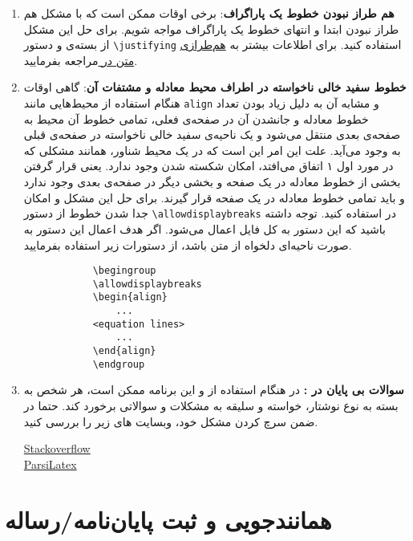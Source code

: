 \begin{enumerate}
\item{\textbf{هم طراز نبودن خطوط یک پاراگراف}:
برخی اوقات ممکن است که با مشکل هم طراز نبودن ابتدا و انتهای خطوط یک پاراگراف مواجه شویم. برای حل این مشکل از بسته‌ی 
 و دستور 
\verb*|\justifying|
استفاده کنید. برای اطلاعات بیشتر به 
\href{https://www.overleaf.com/learn/latex/Text_alignment}{هم‌طرازی متن در \lr{\LaTeX}}
مراجعه بفرمایید. 
}

\item{\textbf{خطوط سفید خالی ناخواسته در اطراف محیط معادله و مشتفات آن}:
گاهی اوقات هنگام استفاده از محیط‌هایی مانند 
\verb*|align|
و مشابه آن به دلیل زیاد بودن تعداد خطوط معادله و جانشدن آن در صفحه‌ی فعلی، تمامی خطوط آن محیط به صفحه‌ی بعدی منتقل می‌شود و یک ناحیه‌ی سفید خالی ناخواسته در صفحه‌ی قبلی به وجود می‌آید. علت این امر این است که در یک محیط شناور، همانند مشکلی که در مورد اول ۱ اتفاق می‌افتد، امکان شکسته شدن وجود ندارد. یعنی قرار گرفتن بخشی از خطوط معادله در یک صفحه و بخشی دیگر در صفحه‌ی بعدی وجود ندارد و باید تمامی خطوط معادله در یک صفحه قرار گیرند. برای حل این مشکل و امکان جدا شدن خطوط از دستور
\verb*|\allowdisplaybreaks|
در 
استفاده کنید. توجه داشته باشید که این دستور به کل فایل اعمال می‌شود. اگر هدف اعمال این دستور به صورت ناحیه‌ای دلخواه از متن باشد، از دستورات زیر استفاده بفرمایید.  

\begin{latin}
	\begin{flushleft}
		\begin{verbatim}
			\begingroup
			\allowdisplaybreaks
			\begin{align}
				...
			<equation lines>
				... 
			\end{align}
			\endgroup
		\end{verbatim}
	\end{flushleft}
\end{latin}  
} 

\item {\textbf{سوالات بی پایان در \lr{\LaTeX}: }}
در هنگام استفاده از \lr{\LaTeX} و این برنامه ممکن است، هر شخص به بسته به نوع نوشتار، خواسته و سلیقه به مشکلات و سوالاتی برخورد کند. حتما در ضمن سرچ کردن مشکل خود، وبسایت های زیر را بررسی کنید. 
	\begin{latin}
	\noindent
	\href{https://stackoverflow.com/}{Stackoverflow}\\
	\href{http://parsilatex.com/site/}{ParsiLatex}
\end{latin}
\end{enumerate}	

\section{همانندجویی و ثبت پایان‌نامه/رساله}

